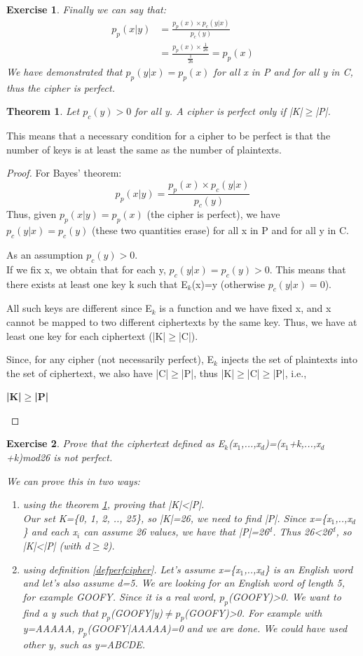 \documentclass[a4paper, 12pt]{report}
\newtheorem{exercise}{\textbf{Exercise}}
\newtheorem{theorem}{\textbf{Theorem}}
\begin{document}
\begin{exercise}
	Finally we can say that:
	\setcounter{equation}{0}
	\begin{align}
	p_p(x|y) &= \frac{p_p(x)\times p_c(y|x)}{p_c(y)}\\
	&= \frac{p_p(x)\times \frac{1}{26}}{\frac{1}{26}} = p_p(x)
	\end{align}
	We have demonstrated that $p_p(y|x) = p_p(x)$ for all x in P and for all y in C, thus the cipher is perfect.
\end{exercise}

\begin{theorem}\label{theoKP}
	Let $p_c(y)>0$ for all y. A cipher is perfect only if |K|$\ge$|P|.
\end{theorem}

This means that a necessary condition for a cipher to be perfect is that the number of keys is at least the same as the number of plaintexts.
\begin{proof}
	For Bayes' theorem:
		\[p_p(x|y) = \frac{p_p(x)\times p_c(y|x)}{p_c(y)}\]
	Thus, given $p_p(x|y) = p_p(x)$ (the cipher is perfect), we have $p_c(y|x) = p_c(y)$ (these two quantities erase) for all x in P and for all y in C.
	
	As an assumption $p_c(y)>0$.\\
	If we fix x, we obtain that for each y, $p_c(y|x) = p_c(y)>0$. This means that there exists at least one key k such that E$_k$(x)=y (otherwise $p_c(y|x)=0$).
	
	All such keys are different since E$_k$ is a function and we have fixed x, and x cannot be mapped to two different ciphertexts by the same key. Thus, we have at least one key for each ciphertext (|K|$\ge$|C|).
	
	Since, for any cipher (not necessarily perfect), E$_k$ injects the set of plaintexts into the set of ciphertext, we also have |C|$\ge$|P|, thus |K|$\ge$|C|$\ge$|P|, i.e.,
	\begin{center}
		\textbf{|K|$\ge$|P|}
	\end{center}
\end{proof}

\begin{exercise}
	Prove that the ciphertext defined as E$_k$(x$_1$,...,x$_d$)=(x$_1$+k,...,x$_d$+k)mod26 is not perfect.
	
	We can prove this in two ways:
	\begin{enumerate}
		\item using the theorem \ref{theoKP}, proving that |K|<|P|.\\
		Our set K=\{0, 1, 2, .., 25\}, so |K|=26, we need to find |P|. Since x=\{x$_1$,..,x$_d$\} and each x$_i$ can assume 26 values, we have that |P|=26$^d$. Thus 26<26$^d$, so |K|<|P| (with d$\ge$2). 
		\item using definition \ref{defperfcipher}. Let's assume x=\{x$_1$,..,x$_d$\} is an English word and let's also assume d=5. We are looking for an English word of length 5, for example \textit{GOOFY}. Since it is a real word, $p_p$(GOOFY)>0. We want to find a y such that $p_p$(GOOFY|y)$\ne p_p$(GOOFY)>0. For example with y=AAAAA, $p_p$(GOOFY|AAAAA)=0 and we are done. We could have used other y, such as y=ABCDE.
	\end{enumerate}
\end{exercise}
\end{document}
